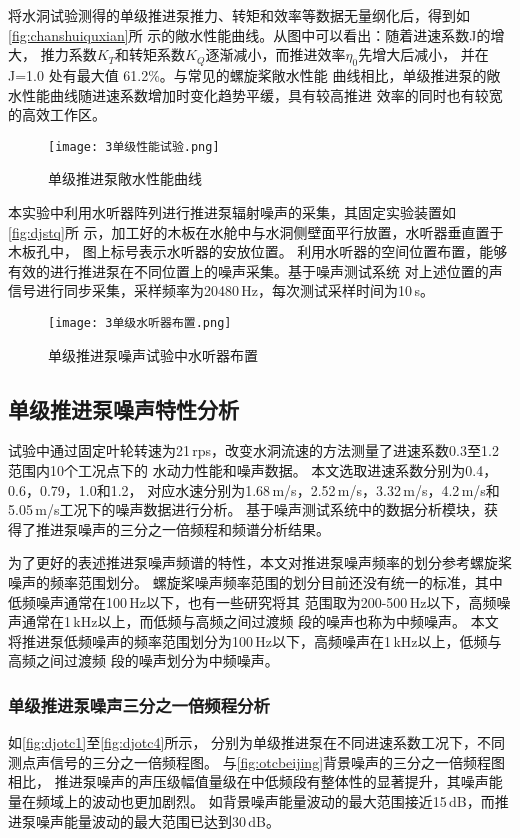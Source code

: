 将水洞试验测得的单级推进泵推力、转矩和效率等数据无量纲化后，得到如\autoref{fig:chanshuiquxian}所
示的敞水性能曲线。从图中可以看出：随着进速系数J的增大，
推力系数$K_T$和转矩系数$K_Q$逐渐减小，而推进效率$\eta_0$先增大后减小，
并在 J=1.0 处有最大值 61.2\%。与常见的螺旋桨敞水性能
曲线相比，单级推进泵的敞水性能曲线随进速系数增加时变化趋势平缓，具有较高推进
效率的同时也有较宽的高效工作区。
\begin{figure}[htbp]
    \centering
    \texttt{[image: 3单级性能试验.png]}
    \caption{\label{fig:chanshuiquxian}单级推进泵敞水性能曲线}
\end{figure}

本实验中利用水听器阵列进行推进泵辐射噪声的采集，其固定实验装置如\autoref{fig:djstq}所
示，加工好的木板在水舱中与水洞侧壁面平行放置，水听器垂直置于木板孔中，
图上标号表示水听器的安放位置。
利用水听器的空间位置布置，能够有效的进行推进泵在不同位置上的噪声采集。基于噪声测试系统
对上述位置的声信号进行同步采集，采样频率为20480\,Hz，每次测试采样时间为10\,s。
\begin{figure}[htbp]
    \centering
    \texttt{[image: 3单级水听器布置.png]}
    \caption{\label{fig:djstq}单级推进泵噪声试验中水听器布置}
\end{figure}
\subsection{单级推进泵噪声特性分析}
试验中通过固定叶轮转速为21\,rps，改变水洞流速的方法测量了进速系数0.3至1.2范围内10个工况点下的
水动力性能和噪声数据。
本文选取进速系数分别为0.4，0.6，0.79，1.0和1.2，
对应水速分别为1.68\,m/s，2.52\,m/s，3.32\,m/s，4.2\,m/s和5.05\,m/s工况下的噪声数据进行分析。
基于噪声测试系统中的数据分析模块，获得了推进泵噪声的三分之一倍频程和频谱分析结果。

为了更好的表述推进泵噪声频谱的特性，本文对推进泵噪声频率的划分参考螺旋桨噪声的频率范围划分。
螺旋桨噪声频率范围的划分目前还没有统一的标准，其中
低频噪声通常在100\,Hz以下，也有一些研究将其
范围取为200-500\,Hz以下，高频噪声通常在1\,kHz以上，而低频与高频之间过渡频
段的噪声也称为中频噪声\cite{xuye2019a}。
本文将推进泵低频噪声的频率范围划分为100\,Hz以下，高频噪声在1\,kHz以上，低频与高频之间过渡频
段的噪声划分为中频噪声。
\subsubsection{单级推进泵噪声三分之一倍频程分析}
如\autoref{fig:djotc1}至\autoref{fig:djotc4}所示，
分别为单级推进泵在不同进速系数工况下，不同测点声信号的三分之一倍频程图。
与\autoref{fig:otcbeijing}背景噪声的三分之一倍频程图相比，
推进泵噪声的声压级幅值量级在中低频段有整体性的显著提升，其噪声能量在频域上的波动也更加剧烈。
如背景噪声能量波动的最大范围接近15\,dB，而推进泵噪声能量波动的最大范围已达到30\,dB。

